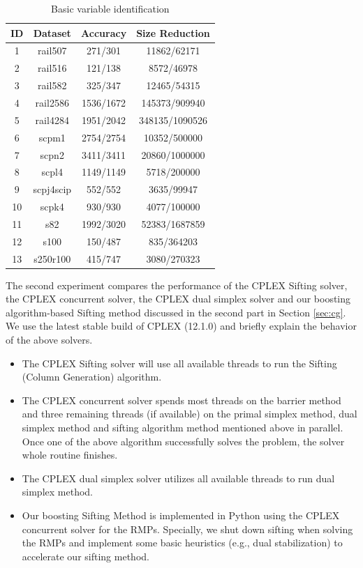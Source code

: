 \documentclass{article} %
\begin{document}
\begin{table}[ht!]
\label{tab:varidy}
\small
\centering
\begin{tabular}{c|c|c|c}
  \hline
  ID & Dataset & Accuracy & Size Reduction\\
  \hline
  1 & rail507 & 271/301 & 11862/62171\\
  2 & rail516 & 121/138 & 8572/46978\\
  3 & rail582 & 325/347 & 12465/54315\\
  4 & rail2586 & 1536/1672 & 145373/909940\\
  5 & rail4284 & 1951/2042 & 348135/1090526\\
  6 & scpm1 & 2754/2754 & 10352/500000\\
  7 & scpn2 & 3411/3411 & 20860/1000000\\
  8 & scpl4 & 1149/1149 & 5718/200000\\
  9 & scpj4scip & 552/552 & 3635/99947\\
  10 & scpk4 & 930/930 & 4077/100000\\
  11 & s82 & 1992/3020 & 52383/1687859\\
  12 & s100 & 150/487 & 835/364203\\
  13 & s250r100 & 415/747 & 3080/270323\\
  \hline
\end{tabular}
\caption{Basic variable identification}
\end{table}

The second experiment compares the performance of the CPLEX Sifting solver, the CPLEX concurrent solver, the CPLEX dual simplex solver and our boosting algorithm-based Sifting method discussed in the second part in Section \ref{sec:cg}. We use the latest stable build of CPLEX (12.1.0) and briefly explain the behavior of the above solvers.

\begin{itemize}
	\item The CPLEX Sifting solver will use all available threads to run the Sifting (Column Generation) algorithm.
	\item The CPLEX concurrent solver spends most threads on the barrier method and three remaining threads (if available) on  the primal simplex method, dual simplex method and sifting algorithm method mentioned above in parallel. Once one of the above algorithm successfully solves the problem, the solver whole routine finishes.
	\item The CPLEX dual simplex solver utilizes all available threads to run dual simplex method.
	\item Our boosting Sifting Method is implemented in Python using the CPLEX concurrent solver for the RMPs. Specially, we shut down sifting when solving the RMPs and implement some basic heuristics (e.g., dual stabilization) to accelerate our sifting method.  
\end{itemize}
\end{document}
